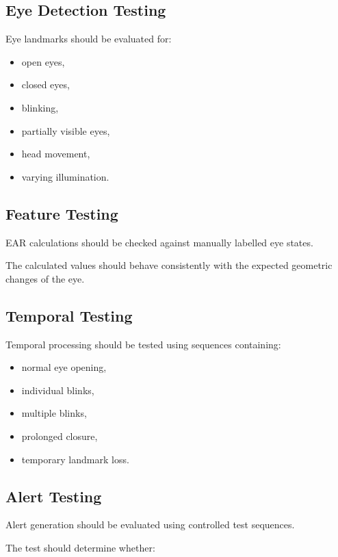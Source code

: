 \documentclass[12pt]{tietreport}
\begin{document}
\subsection{Eye Detection Testing}

Eye landmarks should be evaluated for:

\begin{itemize}[leftmargin=*]
    \item open eyes,
    \item closed eyes,
    \item blinking,
    \item partially visible eyes,
    \item head movement,
    \item varying illumination.
\end{itemize}

\subsection{Feature Testing}

EAR calculations should be checked against manually labelled eye
states.

The calculated values should behave consistently with the expected
geometric changes of the eye.

\subsection{Temporal Testing}

Temporal processing should be tested using sequences containing:

\begin{itemize}[leftmargin=*]
    \item normal eye opening,
    \item individual blinks,
    \item multiple blinks,
    \item prolonged closure,
    \item temporary landmark loss.
\end{itemize}

\subsection{Alert Testing}

Alert generation should be evaluated using controlled test
sequences.

The test should determine whether:
\end{document}
